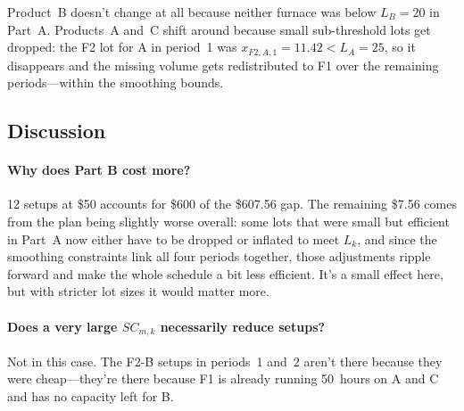\documentclass[11pt,a4paper]{article}
\begin{document}
Product~B doesn't change at all because neither furnace was below $L_B=20$ in
Part~A. Products~A and~C shift around because small sub-threshold lots get
dropped: the F2 lot for A in period~1 was $x_{F2,A,1}=11.42 < L_A=25$, so it
disappears and the missing volume gets redistributed to F1 over the remaining
periods---within the smoothing bounds.

\subsection{Discussion}

\paragraph{Why does Part B cost more?}
12 setups at \$50 accounts for \$600 of the \$607.56 gap. The remaining \$7.56
comes from the plan being slightly worse overall: some lots that were small but
efficient in Part~A now either have to be dropped or inflated to meet $L_k$,
and since the smoothing constraints link all four periods together, those
adjustments ripple forward and make the whole schedule a bit less efficient.
It's a small effect here, but with stricter lot sizes it would matter more.

\paragraph{Does a very large $SC_{m,k}$ necessarily reduce setups?}
Not in this case. The F2-B setups in periods~1 and~2 aren't there because they
were cheap---they're there because F1 is already running 50~hours on A and C
and has no capacity left for B.
\end{document}
